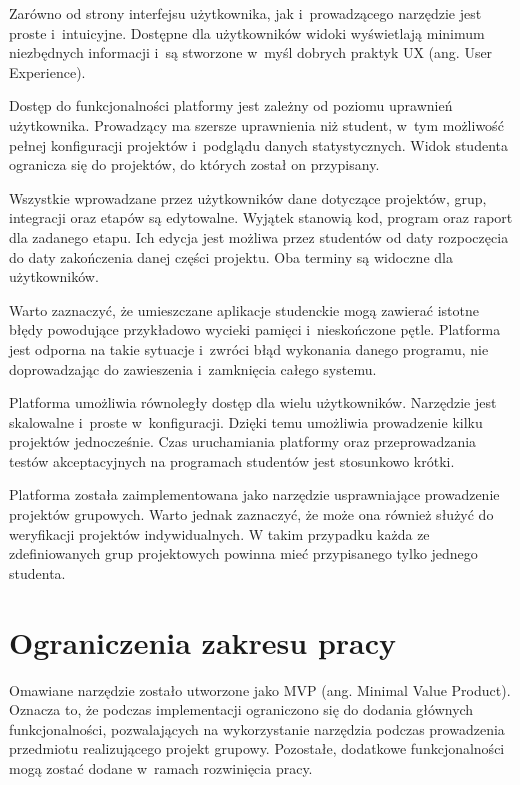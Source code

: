 Zarówno od strony interfejsu użytkownika, jak i~prowadzącego narzędzie jest proste i~intuicyjne.
Dostępne dla użytkowników widoki wyświetlają minimum niezbędnych informacji i~są stworzone w~myśl dobrych praktyk UX (ang. User Experience).

Dostęp do funkcjonalności platformy jest zależny od poziomu uprawnień użytkownika.
Prowadzący ma szersze uprawnienia niż student, w~tym możliwość pełnej konfiguracji projektów i~podglądu danych statystycznych.
Widok studenta ogranicza się do projektów, do których został on przypisany.

Wszystkie wprowadzane przez użytkowników dane dotyczące projektów, grup, integracji oraz etapów są edytowalne.
Wyjątek stanowią kod, program oraz raport dla zadanego etapu.
Ich edycja jest możliwa przez studentów od daty rozpoczęcia do daty zakończenia danej części projektu.
Oba terminy są widoczne dla użytkowników.

Warto zaznaczyć, że umieszczane aplikacje studenckie mogą zawierać istotne błędy powodujące przykładowo wycieki pamięci i~nieskończone pętle.
Platforma jest odporna na takie sytuacje i~zwróci błąd wykonania danego programu, nie doprowadzając do zawieszenia i~zamknięcia całego systemu.

Platforma umożliwia równoległy dostęp dla wielu użytkowników.
Narzędzie jest skalowalne i~proste w~konfiguracji.
Dzięki temu umożliwia prowadzenie kilku projektów jednocześnie.
Czas uruchamiania platformy oraz przeprowadzania testów akceptacyjnych na programach studentów jest stosunkowo krótki.

Platforma została zaimplementowana jako narzędzie usprawniające prowadzenie projektów grupowych.
Warto jednak zaznaczyć, że może ona również służyć do weryfikacji projektów indywidualnych.
W takim przypadku każda ze zdefiniowanych grup projektowych powinna mieć przypisanego tylko jednego studenta.


\section{Ograniczenia zakresu pracy}

Omawiane narzędzie zostało utworzone jako MVP (ang. Minimal Value Product).
Oznacza to, że podczas implementacji ograniczono się do dodania głównych funkcjonalności, pozwalających na wykorzystanie narzędzia podczas prowadzenia przedmiotu realizującego projekt grupowy.
Pozostałe, dodatkowe funkcjonalności mogą zostać dodane w~ramach rozwinięcia pracy.


